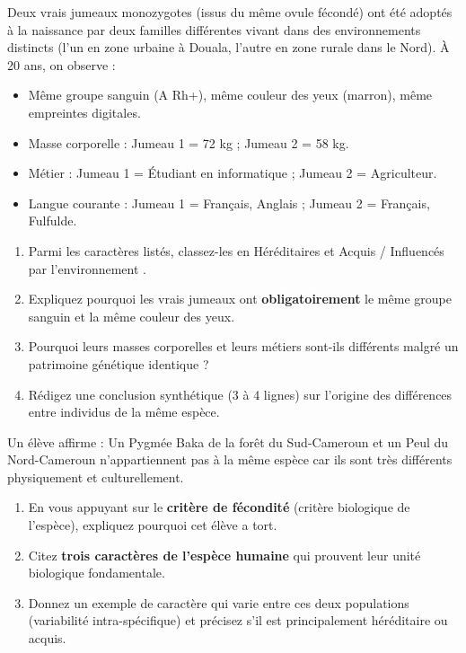 \documentclass[11pt]{article}
\begin{document}
\begin{exercice}
Deux vrais jumeaux monozygotes (issus du même ovule fécondé) ont été adoptés à la naissance par deux familles différentes vivant dans des environnements distincts (l'un en zone urbaine à Douala, l'autre en zone rurale dans le Nord). À 20 ans, on observe :
\begin{itemize}
    \item Même groupe sanguin (A Rh+), même couleur des yeux (marron), même empreintes digitales.
    \item Masse corporelle : Jumeau 1 = 72 kg ; Jumeau 2 = 58 kg.
    \item Métier : Jumeau 1 = Étudiant en informatique ; Jumeau 2 = Agriculteur.
    \item Langue courante : Jumeau 1 = Français, Anglais ; Jumeau 2 = Français, Fulfulde.
\end{itemize}

\begin{enumerate}
    \item Parmi les caractères listés, classez-les en \og Héréditaires \fg et \og Acquis / Influencés par l'environnement \fg.
    \item Expliquez pourquoi les vrais jumeaux ont \textbf{obligatoirement} le même groupe sanguin et la même couleur des yeux.
    \item Pourquoi leurs masses corporelles et leurs métiers sont-ils différents malgré un patrimoine génétique identique ?
    \item Rédigez une conclusion synthétique (3 à 4 lignes) sur l'origine des différences entre individus de la même espèce.
\end{enumerate}
\end{exercice}

\begin{exercice}
Un élève affirme : \og Un Pygmée Baka de la forêt du Sud-Cameroun et un Peul du Nord-Cameroun n'appartiennent pas à la même espèce car ils sont très différents physiquement et culturellement. \fg

\begin{enumerate}
    \item En vous appuyant sur le \textbf{critère de fécondité} (critère biologique de l'espèce), expliquez pourquoi cet élève a tort.
    \item Citez \textbf{trois caractères de l'espèce humaine} qui prouvent leur unité biologique fondamentale.
    \item Donnez un exemple de caractère qui varie entre ces deux populations (variabilité intra-spécifique) et précisez s'il est principalement héréditaire ou acquis.
\end{enumerate}
\end{exercice}
\end{document}
